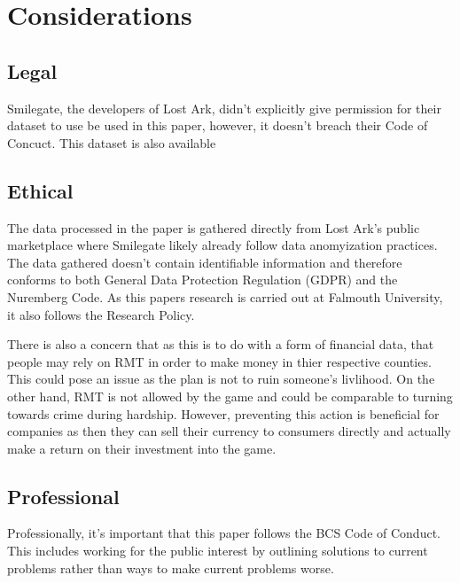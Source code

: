 \documentclass[journal]{IEEEtran}
\begin{document}
\section{Considerations}
\subsection{Legal}
\noindent Smilegate, the developers of Lost Ark, didn't explicitly give permission for their dataset to use be used in this paper, however, it doesn't breach their Code of Concuct\cite{AmazonGamesCOC}. This dataset is also available

\subsection{Ethical}
\noindent The data processed in the paper is gathered directly from Lost Ark's public marketplace where Smilegate likely already follow data anomyization practices\cite{Gruschka2018}. The data gathered doesn't contain identifiable information and therefore conforms to both General Data Protection Regulation (GDPR) and the Nuremberg Code\cite{Nuremberg1947}. As this papers research is carried out at Falmouth University, it also follows the Research Policy\cite{FalmouthEthicsPolicy2022}.

There is also a concern that as this is to do with a form of financial data, that people may rely on RMT in order to make money in thier respective counties. This could pose an issue as the plan is not to ruin someone's livlihood. On the other hand, RMT is not allowed by the game and could be comparable to turning towards crime during hardship. However, preventing this action is beneficial for companies as then they can sell their currency to consumers directly and actually make a return on their investment into the game.

\subsection{Professional}
\noindent Professionally, it's important that this paper follows the BCS Code of Conduct\cite{BCSCodeOfConduct2022}. This includes working for the public interest by outlining solutions to current problems rather than ways to make current problems worse.
\end{document}
